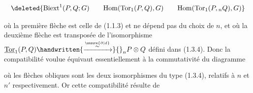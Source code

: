 
\[\deleted{\mathrm{Biext}^1(P,Q;G)\qquad\mathrm{Hom}(\mathrm{Tor}_1(P,Q),G)\qquad\mathrm{Hom}(\mathrm{Tor}_1(P,{}_nQ),G)}\]

où la première flèche est celle de (1.1.3) et ne dépend pas du choix de $n$, et où la deuxième flèche est transposée de l'isomorphisme $\underline{\mathrm{Tor}}_1(P,Q)\handwritten{\xrightarrow{\overset{\unsure{\partial|d}}{\sim}}}{}_nP\otimes Q$ défini dans (1.3.4). Donc la compatibilité voulue équivaut essentiellement à  la commutativité du diagramme


où les flèches obliques sont les deux isomorphismes du type (1.3.4), relatifs à $n$ et $n'$ respectivement. Or cette compatibilité résulte de
\endgroup
